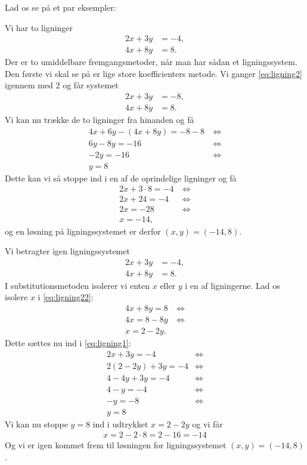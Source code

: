 Lad os se på et par eksempler:
\begin{exa}
	Vi har to ligninger
	\begin{align}
		2x+3y &= -4, \nonumber \\
		4x+8y &= 8.\label{eq:ligning2}
	\end{align}
	Der er to umiddelbare fremgangsmetoder, når man har sådan et ligningssystem. Den første
	vi skal se på er lige store koefficienters metode. Vi ganger \eqref{eq:ligning2} igennem
	med $2$ og får systemet
	\begin{align*}
		2x+3y &= -8,\\
		4x+8y &= 8.
	\end{align*}	
	Vi kan nu trække de to ligninger fra hinanden og få
	\begin{align*}
		4x+6y-(4x+8y) = -8-8 \ &\Leftrightarrow\\
		6y-8y=-16 &\Leftrightarrow\\
		-2y=-16 &\Leftrightarrow \\
		y = 8
	\end{align*}
	Dette kan vi så stoppe ind i en af de oprindelige ligninger og få 
	\begin{align*}
		2x+3\cdot 8 =-4 \ &\Leftrightarrow\\
		2x + 24 = -4 &\Leftrightarrow\\
		2x = -28 &\Leftrightarrow\\
		x = -14,
	\end{align*}
	og en løsning på ligningssystemet er derfor $(x,y) = (-14,8)$.
	\end{exa}
\begin{exa}[Substitutionsmetoden]
Vi betragter igen ligningssystemet
\begin{align}
2x+3y &= -4\label{eq:ligning1},\\
4x+8y &= 8\label{eq:ligning22}.
\end{align}
I substitutionsmetoden isolerer vi enten $x$ eller $y$ i en af ligningerne. Lad os isolere $x$ i \eqref{eq:ligning22}:
\begin{align*}
4x + 8y = 8 \ &\Leftrightarrow\\
4x = 8-8y &\Leftrightarrow\\
x = 2 - 2y.
\end{align*}
Dette sættes nu ind i \eqref{eq:ligning1}:
\begin{align*}
2x + 3y = -4 &\Leftrightarrow\\
2(2-2y) + 3y = -4 &\Leftrightarrow\\
4-4y +3y = -4 &\Leftrightarrow\\
4-y = -4 &\Leftrightarrow\\
-y = -8 &\Leftrightarrow\\
y = 8
\end{align*}
Vi kan nu stoppe $y=8$ ind i udtrykket $x = 2-2y$ og vi får
\begin{align*}
x = 2-2\cdot 8 = 2-16 = -14
\end{align*}
Og vi er igen kommet frem til løsningen for ligningssystemet $(x,y) = (-14,8)$.
\end{exa}
